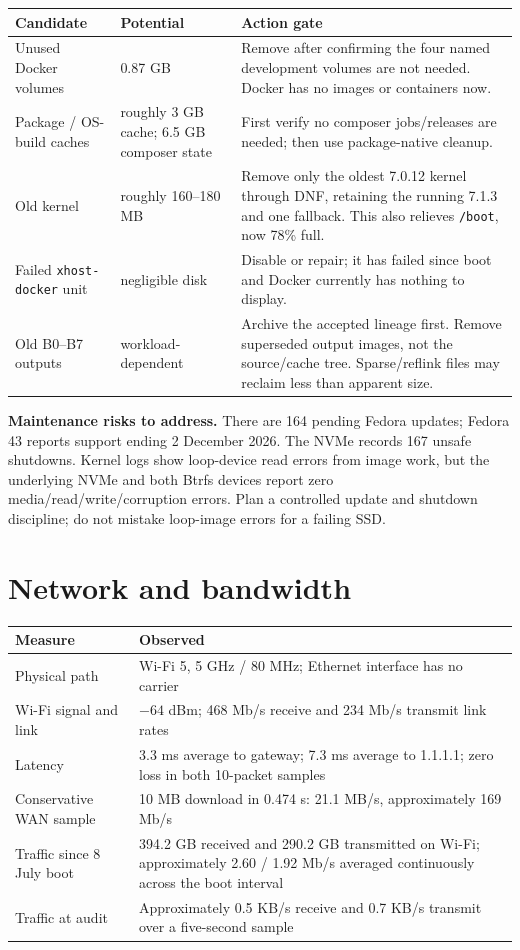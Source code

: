 \documentclass[11pt,letterpaper]{article}
\newcommand{\mono}[1]{\texttt{#1}}
\begin{document}
\begin{tabularx}{\textwidth}{@{}L{1.75in}L{1.05in}Y@{}}
\toprule
\textbf{Candidate} & \textbf{Potential} & \textbf{Action gate} \\
\midrule
Unused Docker volumes & 0.87 GB & Remove after confirming the four named development volumes are not needed. Docker has no images or containers now. \\
Package / OS-build caches & roughly 3 GB cache; 6.5 GB composer state & First verify no composer jobs/releases are needed; then use package-native cleanup. \\
Old kernel & roughly 160--180 MB & Remove only the oldest 7.0.12 kernel through DNF, retaining the running 7.1.3 and one fallback. This also relieves \mono{/boot}, now 78\% full. \\
Failed \mono{xhost-docker} unit & negligible disk & Disable or repair; it has failed since boot and Docker currently has nothing to display. \\
Old B0--B7 outputs & workload-dependent & Archive the accepted lineage first. Remove superseded output images, not the source/cache tree. Sparse/reflink files may reclaim less than apparent size. \\
\bottomrule
\end{tabularx}

\begin{riskbox}
\textbf{Maintenance risks to address.} There are 164 pending Fedora updates; Fedora 43 reports support ending 2 December 2026. The NVMe records 167 unsafe shutdowns. Kernel logs show loop-device read errors from image work, but the underlying NVMe and both Btrfs devices report zero media/read/write/corruption errors. Plan a controlled update and shutdown discipline; do not mistake loop-image errors for a failing SSD.
\end{riskbox}

\section{Network and bandwidth}

\begin{tabularx}{\textwidth}{@{}L{2.0in}Y@{}}
\toprule
\textbf{Measure} & \textbf{Observed} \\
\midrule
Physical path & Wi-Fi 5, 5 GHz / 80 MHz; Ethernet interface has no carrier \\
Wi-Fi signal and link & $-64$ dBm; 468 Mb/s receive and 234 Mb/s transmit link rates \\
Latency & 3.3 ms average to gateway; 7.3 ms average to 1.1.1.1; zero loss in both 10-packet samples \\
Conservative WAN sample & 10 MB download in 0.474 s: 21.1 MB/s, approximately 169 Mb/s \\
Traffic since 8 July boot & 394.2 GB received and 290.2 GB transmitted on Wi-Fi; approximately 2.60 / 1.92 Mb/s averaged continuously across the boot interval \\
Traffic at audit & Approximately 0.5 KB/s receive and 0.7 KB/s transmit over a five-second sample \\
\bottomrule
\end{tabularx}
\end{document}
